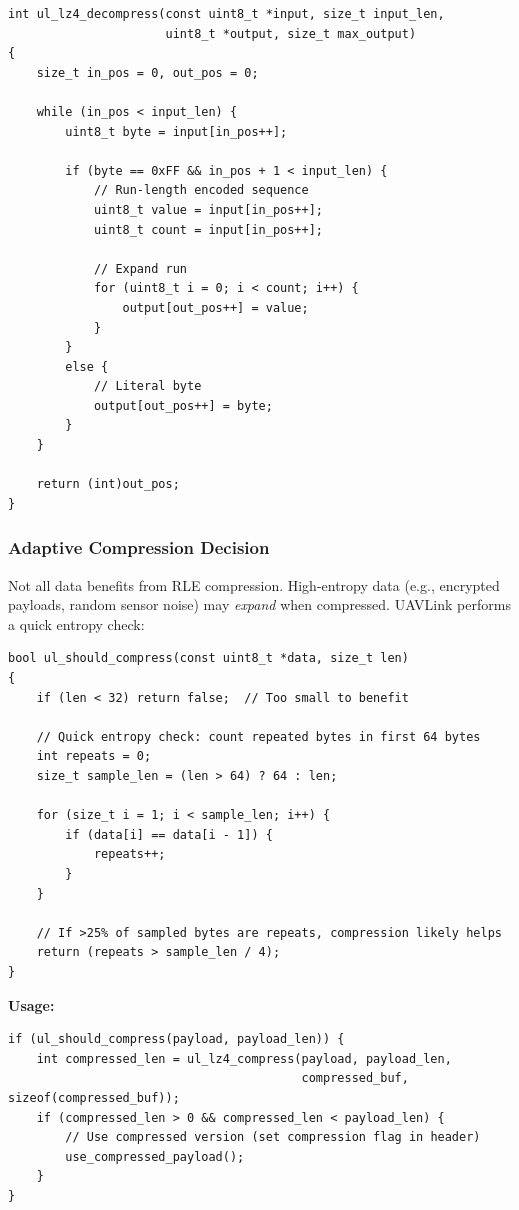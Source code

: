 \documentclass[11pt,a4paper]{article}
\begin{document}
\begin{lstlisting}[caption={RLE Decompression (ul\_lz4\_decompress)}]
int ul_lz4_decompress(const uint8_t *input, size_t input_len,
                      uint8_t *output, size_t max_output)
{
    size_t in_pos = 0, out_pos = 0;

    while (in_pos < input_len) {
        uint8_t byte = input[in_pos++];

        if (byte == 0xFF && in_pos + 1 < input_len) {
            // Run-length encoded sequence
            uint8_t value = input[in_pos++];
            uint8_t count = input[in_pos++];

            // Expand run
            for (uint8_t i = 0; i < count; i++) {
                output[out_pos++] = value;
            }
        }
        else {
            // Literal byte
            output[out_pos++] = byte;
        }
    }

    return (int)out_pos;
}
\end{lstlisting}

\subsubsection{Adaptive Compression Decision}

Not all data benefits from RLE compression. High-entropy data (e.g., encrypted payloads, random sensor noise) may \emph{expand} when compressed. UAVLink performs a quick entropy check:

\begin{lstlisting}[caption={Adaptive Compression Heuristic}]
bool ul_should_compress(const uint8_t *data, size_t len)
{
    if (len < 32) return false;  // Too small to benefit

    // Quick entropy check: count repeated bytes in first 64 bytes
    int repeats = 0;
    size_t sample_len = (len > 64) ? 64 : len;
    
    for (size_t i = 1; i < sample_len; i++) {
        if (data[i] == data[i - 1]) {
            repeats++;
        }
    }

    // If >25% of sampled bytes are repeats, compression likely helps
    return (repeats > sample_len / 4);
}
\end{lstlisting}

\textbf{Usage:}
\begin{lstlisting}
if (ul_should_compress(payload, payload_len)) {
    int compressed_len = ul_lz4_compress(payload, payload_len,
                                         compressed_buf, sizeof(compressed_buf));
    if (compressed_len > 0 && compressed_len < payload_len) {
        // Use compressed version (set compression flag in header)
        use_compressed_payload();
    }
}
\end{lstlisting}
\end{document}
